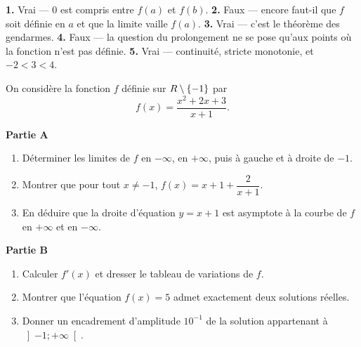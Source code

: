 \begin{corrige}[je me teste]
\textbf{1.} Vrai — $0$ est compris entre $f(a)$ et $f(b)$.
\textbf{2.} Faux — encore faut-il que $f$ soit définie en $a$ et que la limite
vaille $f(a)$.
\textbf{3.} Vrai — c'est le théorème des gendarmes.
\textbf{4.} Faux — la question du prolongement ne se pose qu'aux points où la
fonction n'est pas définie.
\textbf{5.} Vrai — continuité, stricte monotonie, et $-2 < 3 < 4$.
\end{corrige}

\begin{commeaubac}
On considère la fonction $f$ définie sur $R \setminus \{-1\}$ par
\[
  f(x) = \frac{x^{2} + 2x + 3}{x + 1}.
\]

\textbf{Partie A}
\begin{enumerate}[label=\textbf{\arabic*.}, leftmargin=*, itemsep=0.25em]
  \item Déterminer les limites de $f$ en $-\infty$, en $+\infty$, puis à
        gauche et à droite de $-1$.
  \item Montrer que pour tout $x \neq -1$, $f(x) = x + 1 + \dfrac{2}{x+1}$.
  \item En déduire que la droite d'équation $y = x+1$ est asymptote à la
        courbe de $f$ en $+\infty$ et en $-\infty$.
\end{enumerate}

\textbf{Partie B}
\begin{enumerate}[label=\textbf{\arabic*.}, leftmargin=*, itemsep=0.25em, start=4]
  \item Calculer $f'(x)$ et dresser le tableau de variations de $f$.
  \item Montrer que l'équation $f(x) = 5$ admet exactement deux solutions
        réelles.
  \item Donner un encadrement d'amplitude $10^{-1}$ de la solution
        appartenant à $\left]-1 ; +\infty\right[$.
\end{enumerate}
\end{commeaubac}

